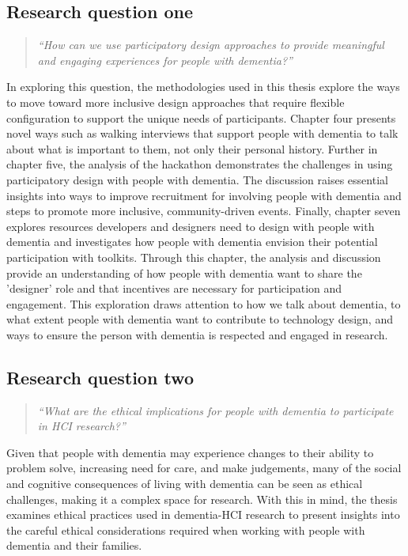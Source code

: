 \subsection{Research question one}
\label{RQ1}
\begin{quote}
\textit{``How can we use participatory design approaches to provide meaningful and engaging experiences for people with dementia?''}
\end{quote}
In exploring this question, the methodologies used in this thesis explore the ways to move toward more inclusive design approaches that require flexible configuration to support the unique needs of participants. Chapter four presents novel ways such as walking interviews that support people with dementia to talk about what is important to them, not only their personal history. Further in chapter five, the analysis of the hackathon demonstrates the challenges in using participatory design with people with dementia. The discussion raises essential insights into ways to improve recruitment for involving people with dementia and steps to promote more inclusive, community-driven events. Finally, chapter seven explores resources developers and designers need to design with people with dementia and investigates how people with dementia envision their potential participation with toolkits. Through this chapter, the analysis and discussion provide an understanding of how people with dementia want to share the 'designer' role and that incentives are necessary for participation and engagement. This exploration draws attention to how we talk about dementia, to what extent people with dementia want to contribute to technology design, and ways to ensure the person with dementia is respected and engaged in research.

\subsection{Research question two}
\label{RQ2}
\begin{quote}
\textit{``What are the ethical implications for people with dementia to participate in HCI research?''}
\end{quote}
Given that people with dementia may experience changes to their ability to problem solve, increasing need for care, and make judgements, many of the social and cognitive consequences of living with dementia can be seen as ethical challenges, making it a complex space for research. With this in mind, the thesis examines ethical practices used in dementia-HCI research to present insights into the careful ethical considerations required when working with people with dementia and their families. 

